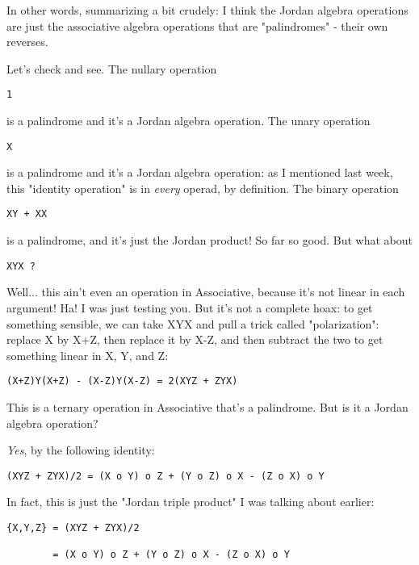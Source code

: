 In other words, summarizing a bit crudely: I think the Jordan algebra
operations are just the associative algebra operations that are
"palindromes" - their own reverses.

Let's check and see.  The nullary operation

\begin{verbatim}
1
\end{verbatim}
    
is a palindrome and it's a Jordan algebra operation.  The unary
operation

\begin{verbatim}
X
\end{verbatim}
    
is a palindrome and it's a Jordan algebra operation: as I mentioned last
week, this "identity operation" is in \emph{every} 
operad, by definition.
The binary operation

\begin{verbatim}
XY + XX
\end{verbatim}
    
is a palindrome, and it's just the Jordan product!  So far so good.  
But what about

\begin{verbatim}
XYX ?
\end{verbatim}
    
Well... this ain't even an operation in Associative, because it's not
linear in each argument!  Ha!  I was just testing you.  But it's not a
complete hoax: to get something sensible, we can take XYX and pull a
trick called "polarization": replace X by X+Z, then replace it
by X-Z, and then subtract the two to get something linear in X, Y, and
Z:

\begin{verbatim}
(X+Z)Y(X+Z) - (X-Z)Y(X-Z) = 2(XYZ + ZYX)
\end{verbatim}
    
This is a ternary operation in Associative that's a palindrome.
But is it a Jordan algebra operation?  

\emph{Yes}, by the following identity:

\begin{verbatim}
(XYZ + ZYX)/2 = (X o Y) o Z + (Y o Z) o X - (Z o X) o Y    
\end{verbatim}
    
In fact, this is just the "Jordan triple product" I was
talking about earlier:

\begin{verbatim}
{X,Y,Z} = (XYZ + ZYX)/2 

        = (X o Y) o Z + (Y o Z) o X - (Z o X) o Y    
\end{verbatim}
    
